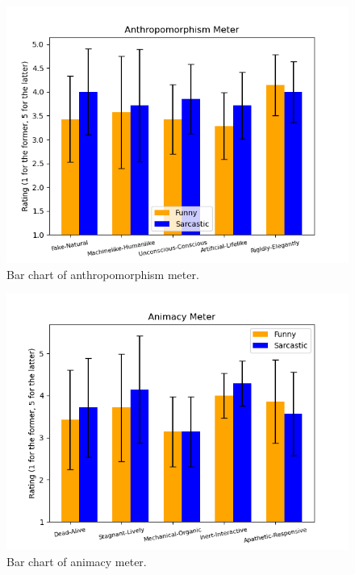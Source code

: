 \documentclass[conference]{IEEEtran}
\begin{document}
\FloatBarrier
    \begin{figure}[htbp]
        \centering
        \includegraphics[width = \linewidth]{Pics/AnthroBar.png}
        \caption{Bar chart of anthropomorphism meter.}
        \label{fig:AnthroBar}
    \end{figure}

        \begin{figure}[htbp]
        \centering
        \includegraphics[width = \linewidth]{Pics/AnimacyBar.png}
        \caption{Bar chart of animacy meter.}
        \label{fig:AnimacyBar}
    \end{figure}
\end{document}
